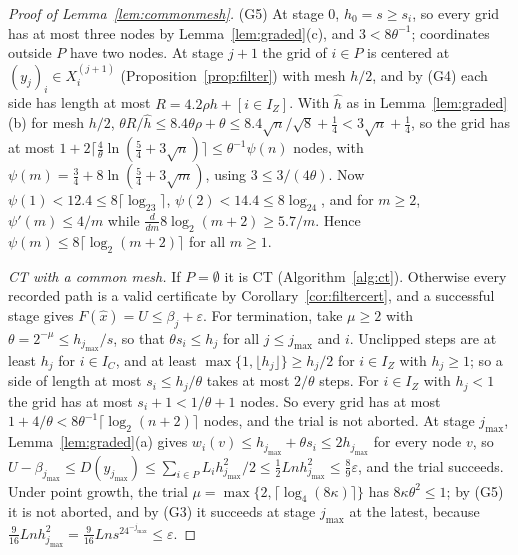 \begin{proof}[Proof of Lemma~\ref{lem:commonmesh}]
(G5) At stage $0$, $h_0=s\ge s_i$, so every grid has at most three nodes by
Lemma~\ref{lem:graded}(c), and $3<8\theta^{-1}$; coordinates outside $P$ have
two nodes. At stage $j+1$ the grid of $i\in P$ is centered at
$(y_j)_i\in X_i^{(j+1)}$ (Proposition~\ref{prop:filter}) with mesh $h/2$, and
by (G4) each side has length at most $R=4.2\rho h+[i\in I_Z]$. With $\hat h$
as in Lemma~\ref{lem:graded}(b) for mesh $h/2$,
$\theta R/\hat h\le8.4\theta\rho+\theta\le8.4\sqrt n/\sqrt8+\frac14
<3\sqrt n+\frac14$, so the grid has at most
$1+2\lceil\frac4\theta\ln(\frac54+3\sqrt n)\rceil\le\theta^{-1}\psi(n)$
nodes, with $\psi(m)=\frac34+8\ln(\frac54+3\sqrt m)$, using
$3\le3/(4\theta)$. Now $\psi(1)<12.4\le8\lceil\log_23\rceil$,
$\psi(2)<14.4\le8\log_24$, and for $m\ge2$, $\psi'(m)\le4/m$ while
$\frac{d}{dm}8\log_2(m+2)\ge5.7/m$. Hence
$\psi(m)\le8\lceil\log_2(m+2)\rceil$ for all $m\ge1$.

\emph{CT with a common mesh.} If $P=\emptyset$ it is CT
(Algorithm~\ref{alg:ct}). Otherwise every recorded path is a valid
certificate by Corollary~\ref{cor:filtercert}, and a successful stage gives
$F(\hat x)=U\le\beta_j+\varepsilon$. For termination, take $\mu\ge2$ with
$\theta=2^{-\mu}\le h_{j_{\max}}/s$, so that $\theta s_i\le h_j$ for all
$j\le j_{\max}$ and $i$. Unclipped steps are at least $h_j$ for
$i\in I_C$, and at least $\max\{1,\lfloor h_j\rfloor\}\ge h_j/2$ for
$i\in I_Z$ with $h_j\ge1$; so a side of length at most $s_i\le h_j/\theta$
takes at most $2/\theta$ steps. For $i\in I_Z$ with $h_j<1$ the grid has at
most $s_i+1<1/\theta+1$ nodes. So every grid has at most
$1+4/\theta<8\theta^{-1}\lceil\log_2(n+2)\rceil$ nodes, and the trial is not
aborted. At stage $j_{\max}$, Lemma~\ref{lem:graded}(a) gives
$w_i(v)\le h_{j_{\max}}+\theta s_i\le2h_{j_{\max}}$ for every node $v$, so
$U-\beta_{j_{\max}}\le D(y_{j_{\max}})\le\sum_{i\in P}L_ih_{j_{\max}}^2/2
\le\frac12Lnh_{j_{\max}}^2\le\frac89\varepsilon$, and the trial succeeds.
Under point growth, the trial $\mu=\max\{2,\lceil\log_4(8\kappa)\rceil\}$ has $8\kappa\theta^2\le1$;
by (G5) it is not aborted, and by (G3) it succeeds at stage $j_{\max}$ at the
latest, because
$\frac9{16}Lnh_{j_{\max}}^2=\frac9{16}Lns^24^{-j_{\max}}\le\varepsilon$.
\end{proof}

